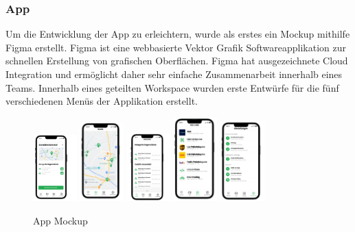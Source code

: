 ﻿\subsubsection{App}
Um die Entwicklung der App zu erleichtern, wurde als erstes ein Mockup mithilfe Figma erstellt. Figma ist eine webbasierte Vektor Grafik Softwareapplikation zur schnellen Erstellung von grafischen Oberflächen. Figma hat ausgezeichnete Cloud Integration und ermöglicht daher sehr einfache Zusammenarbeit innerhalb eines Teams. Innerhalb eines geteilten Workspace wurden erste Entwürfe für die fünf verschiedenen Menüs der Applikation erstellt.

\begin{figure}[h]
  \centering
  \includegraphics[width=0.15\textwidth]{images/app_mock_tower}
  \includegraphics[width=0.15\textwidth]{images/app_mock_map}
  \includegraphics[width=0.15\textwidth]{images/app_mock_objects}
  \includegraphics[width=0.15\textwidth]{images/app_mock_services}
  \includegraphics[width=0.15\textwidth]{images/app_mock_settings}
  \caption{App Mockup}
  \label{fig:app_mockup}
\end{figure}
